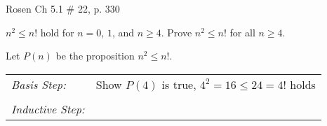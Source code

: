 \documentclass[12pt,addpoints]{exam}
\newcommand{\ds}{\displaystyle}
\begin{document}
\begin{questions}
%	
%
%
%
%
%


\question[9] Rosen Ch 5.1 \# 22, p. 330
    \ifprintanswers
        \vspace{-10pt}
   \fi
\begin{solution}
$n^2 \leq n!$ hold for $n=0$, $1$, and $n \geq 4$.  Prove $n^2 \leq n!$ for all $n \geq 4$.

\smallskip 
Let $P(n)$ be the proposition $n^2 \leq n!$.

\smallskip
\begin{tabular}{lp{4in}}
  \textit{Basis Step:} & Show $P(4)$ is true, $4^2 = 16 \leq 24 = 4!$ holds \\
   & \\
 \textit{Inductive Step:} &  \\
\end{tabular}


\end{solution}
\end{questions}
\end{document}
